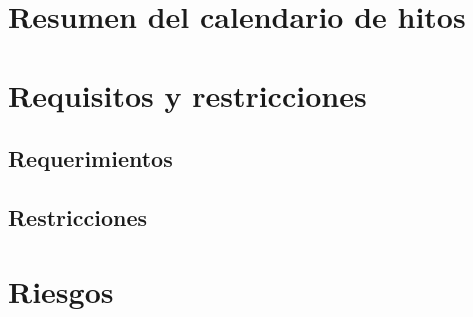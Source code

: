 \documentclass[12pt]{charter}
\begin{document}
\section*{Resumen del calendario de hitos}
\label{sec:milestones}

\section*{Requisitos y restricciones}
\label{sec:require-n-constrain}
	\subsection*{Requerimientos}
	\label{subsec:requirements}
	
	\subsection*{Restricciones}
	\label{subsec:constraints}

\section*{Riesgos}
\label{sec:risks}

\end{document}
